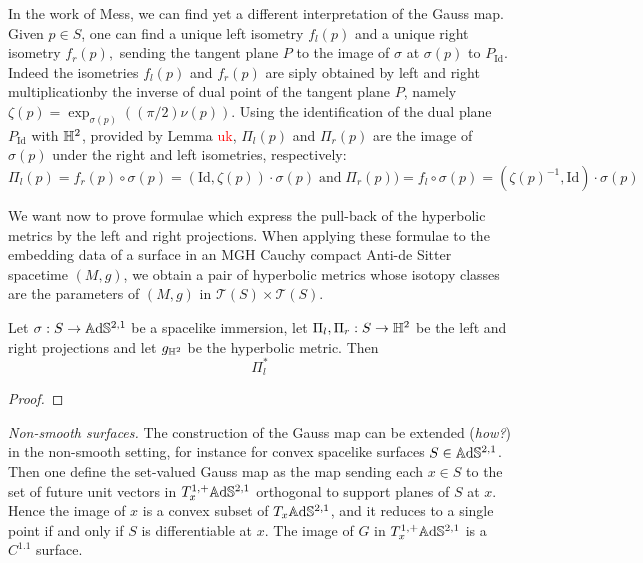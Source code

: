      \begin{observation}
        In the work of Mess, we can find yet a different interpretation of the Gauss map. Given $p\in S$, one can find a unique left isometry $f_l(p)$ and a unique right isometry $f_r(p),$ sending the tangent plane $P$ to the image of $\sigma$ at $\sigma(p)$ to $P_{\text{Id}}$. Indeed the isometries $f_l(p)$ and $f_r(p)$ are siply obtained by left and right multiplicationby the inverse of dual point of the tangent plane $P$, namely $\zeta(p)=\exp_{\sigma(p)}((\pi/2)\nu(p))$. Using the identification of the dual plane $P_{\text{Id}}$ with $\mathbb{H}^2$, provided by Lemma \textcolor{red}{uk}, $\Pi_l(p)$ and $\Pi_r(p)$ are the image of $\sigma(p)$ under the right and left isometries, respectively:
        \[
        \Pi_l(p)=f_r(p)\circ\sigma(p)=(\text{Id},\zeta(p))\cdot \sigma(p)\;\text{and}\;\Pi_r(p))=f_l\circ\sigma(p)=(\zeta(p)^{-1},\text{Id})\cdot\sigma(p)\
        \]
    \end{observation}


We want now to prove formulae which express the pull-back of the hyperbolic metrics by the left and right projections. When applying these formulae to the embedding data of a surface in an MGH Cauchy compact Anti-de Sitter spacetime $(M,g)$, we obtain a pair of hyperbolic metrics whose isotopy classes are the parameters of $(M,g)$
in $\mathcal{T}(S)\times\mathcal{T}(S).$

\begin{proposition}
    Let $\sigma:S\to\mathbb{A}\mathrm{d}\mathbb{S}^{2,1}$ be a spacelike immersion, let $\Pi_l,\Pi_r:S\to\mathbb{H}^2$ be the left and right projections and let $g_{\mathbb{H}^2}$ be the hyperbolic metric. Then 
    \begin{equation}
        \Pi_l^*
    \end{equation}
\end{proposition}

\begin{proof}
    
\end{proof}

\textit{Non-smooth surfaces.} The construction of the Gauss map can be extended (\textit{how?}) in the non-smooth setting, for instance for convex spacelike surfaces $S\in\mathbb{A}\mathrm{d}\mathbb{S}^{2,1}$. Then one define the set-valued Gauss map as the map sending each $x\in S$ to the set of future unit vectors in $T_x^{1,+}\mathbb{A}\mathrm{d}\mathbb{S}^{2,1}$ orthogonal to support planes of $S$ at $x$. Hence the image of $x$ is a convex subset of $T_x\mathbb{A}\mathrm{d}\mathbb{S}^{2,1}$, and it reduces to a single point if and only if $S$ is differentiable at $x$. The image of $G$ in $T^{1,+}_x\mathbb{A}\mathrm{d}\mathbb{S}^{2,1}$ is a $C^{1.1}$ surface. \\

